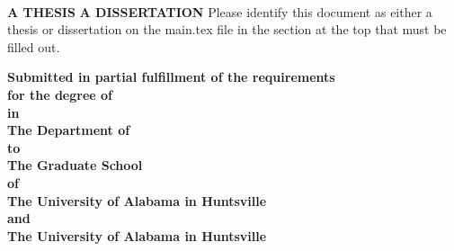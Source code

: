 \begin{titlepage}
    \begin{center}
        \large
        \singlespacing
        \textbf{\thesistitle}
        

\vspace{2.8cm}

        \Large
        \textbf{\makebox[0pt]{\studentname}}\\
        \vspace{1.5cm}
        \normalsize
        \ifdefined\thesis
        \textbf{A THESIS}
        \vspace{1.5cm}
        \else
        \ifdefined\dissertation
        \textbf{A DISSERTATION}
        \vspace{1.5cm}
        \else
        Please identify this document as either a thesis or dissertation on the main.tex file in the section at the top that must be filled out.
        \vspace{1.5cm}
        \fi
        \fi

        \textbf{Submitted in partial fulfillment of the requirements \\for the degree of \degree}\\  
        
\vspace{0.1cm}
  \textbf{in}\\
      \vspace{0.1cm}
        \textbf{The Department of \department}\\
        \vspace{0.1cm}
  \textbf{to}\\
\vspace{0.1cm}
\textbf{The Graduate School}\\
\vspace{0.1cm}
\textbf{of}\\
\vspace{0.1cm}
        \ifdefined\jointuni
        \textbf{The University of Alabama in Huntsville\\ and\\  \jointuni}
        \else
        \textbf{The University of Alabama in Huntsville}
    \fi

        
        \vspace{0.4cm}
        \textbf{\gradmonth\ \gradyear}
        


    \end{center}
    

\end{titlepage}
